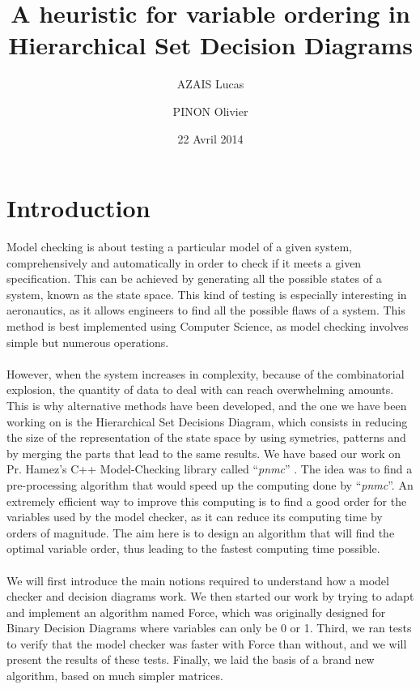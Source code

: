 \documentclass[12pt]{report}
\title{A heuristic for variable ordering in Hierarchical Set Decision Diagrams}
\author{ AZAIS Lucas \and PINON Olivier}
\date{22 Avril 2014}
\begin{document}
\maketitle

\tableofcontents
\newpage

\section*{Introduction} %

Model checking is about testing a particular model of a given system, comprehensively and automatically in order to check if it meets a given specification. This can be achieved by generating all the possible states of a system, known as the state space. This kind of testing is especially interesting in aeronautics, as it allows engineers to find all the possible flaws of a system. This method is best implemented using Computer Science, as model checking involves simple but numerous operations.
\\\\
However, when the system increases in complexity, because of the combinatorial explosion, the quantity of data to deal with can reach overwhelming amounts. This is why alternative methods have been developed, and the one we have been working on is the Hierarchical Set Decisions Diagram, which consists in reducing the size of the representation of the state space by using symetries, patterns and by merging the parts that lead to the same results. We have based our work on Pr. Hamez’s C++ Model-Checking library called \enquote{\textit{pnmc}} \cite{pnmc}. The idea was to find a pre-processing algorithm that would speed up the computing done by \enquote{\textit{pnmc}}. An extremely efficient way to improve this computing is to find a good order for the variables used by the model checker, as it can reduce its computing time by orders of magnitude. The aim here is to design an algorithm that will find the optimal variable order, thus leading to the fastest computing time possible.
\\\\
We will first introduce the main notions required to understand how a model checker and decision diagrams work. We then started our work by trying to adapt and implement an algorithm named Force, which was originally designed for Binary Decision Diagrams where variables can only be 0 or 1. Third, we ran tests to verify that the model checker was faster with Force than without, and we will present the results of these tests. Finally, we laid the basis of a brand new algorithm, based on much simpler matrices.
\end{document}
